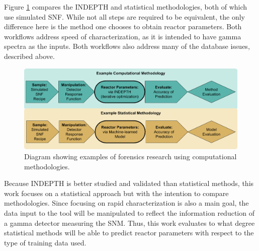 Figure \ref{fig:compworkflow} compares the \gls{INDEPTH} and statistical
methodologies, both of which use simulated \gls{SNF}.  While not all steps are
required to be equivalent, the only difference here is the method one chooses
to obtain reactor parameters. Both workflows address speed of characterization,
as it is intended to have gamma spectra as the inputs. Both workflows also
address many of the database issues, described above. 

\begin{figure}[!h]
  \includegraphics[width=\linewidth]{./chapters/intro/CompStatForensicsWorkflow.png}
  \caption{Diagram showing examples of forensics research using computational methodologies.}
  \label{fig:compworkflow}
\end{figure}

Because \gls{INDEPTH} is better studied and validated than statistical methods,
this work focuses on a statistical approach but with the intention to compare
methodologies.  Since focusing on rapid characterization is also a main goal, the
data input to the tool will be manipulated to reflect the information reduction
of a gamma detector measuring the \gls{SNM}. Thus, this work evaluates to what
degree statistical methods will be able to predict reactor parameters with
respect to the type of training data used.  

